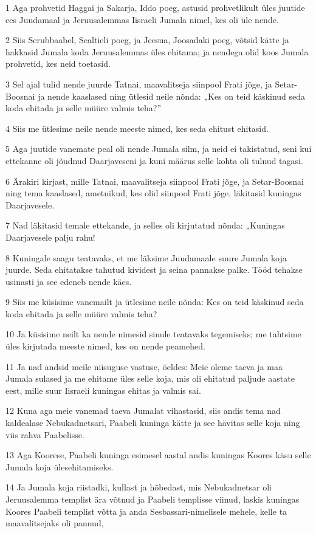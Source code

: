 \par 1 Aga prohvetid Haggai ja Sakarja, Iddo poeg, astusid prohvetlikult üles juutide ees Juudamaal ja Jeruusalemmas Iisraeli Jumala nimel, kes oli üle nende.
\par 2 Siis Serubbaabel, Sealtieli poeg, ja Jeesua, Joosadaki poeg, võtsid kätte ja hakkasid Jumala koda Jeruusalemmas üles ehitama; ja nendega olid koos Jumala prohvetid, kes neid toetasid.
\par 3 Sel ajal tulid nende juurde Tatnai, maavalitseja siinpool Frati jõge, ja Setar-Boosnai ja nende kaaslased ning ütlesid neile nõnda: „Kes on teid käskinud seda koda ehitada ja selle müüre valmis teha?”
\par 4 Siis me ütlesime neile nende meeste nimed, kes seda ehitust ehitasid.
\par 5 Aga juutide vanemate peal oli nende Jumala silm, ja neid ei takistatud, seni kui ettekanne oli jõudnud Daarjaveseni ja kuni määrus selle kohta oli tulnud tagasi.
\par 6 Ärakiri kirjast, mille Tatnai, maavalitseja siinpool Frati jõge, ja Setar-Boosnai ning tema kaaslased, ametnikud, kes olid siinpool Frati jõge, läkitasid kuningas Daarjavesele.
\par 7 Nad läkitasid temale ettekande, ja selles oli kirjutatud nõnda: „Kuningas Daarjavesele palju rahu!
\par 8 Kuningale saagu teatavaks, et me läksime Juudamaale suure Jumala koja juurde. Seda ehitatakse tahutud kividest ja seina pannakse palke. Tööd tehakse usinasti ja see edeneb nende käes.
\par 9 Siis me küsisime vanemailt ja ütlesime neile nõnda: Kes on teid käskinud seda koda ehitada ja selle müüre valmis teha?
\par 10 Ja küsisime neilt ka nende nimesid sinule teatavaks tegemiseks; me tahtsime üles kirjutada meeste nimed, kes on nende peamehed.
\par 11 Ja nad andsid meile niisuguse vastuse, öeldes: Meie oleme taeva ja maa Jumala sulased ja me ehitame üles selle koja, mis oli ehitatud paljude aastate eest, mille suur Iisraeli kuningas ehitas ja valmis sai.
\par 12 Kuna aga meie vanemad taeva Jumalat vihastasid, siis andis tema nad kaldealase Nebukadnetsari, Paabeli kuninga kätte ja see hävitas selle koja ning viis rahva Paabelisse.
\par 13 Aga Koorese, Paabeli kuninga esimesel aastal andis kuningas Koores käsu selle Jumala koja ülesehitamiseks.
\par 14 Ja Jumala koja riistadki, kullast ja hõbedast, mis Nebukadnetsar oli Jeruusalemma templist ära võtnud ja Paabeli templisse viinud, laskis kuningas Koores Paabeli templist võtta ja anda Sesbassari-nimelisele mehele, kelle ta maavalitsejaks oli pannud,
